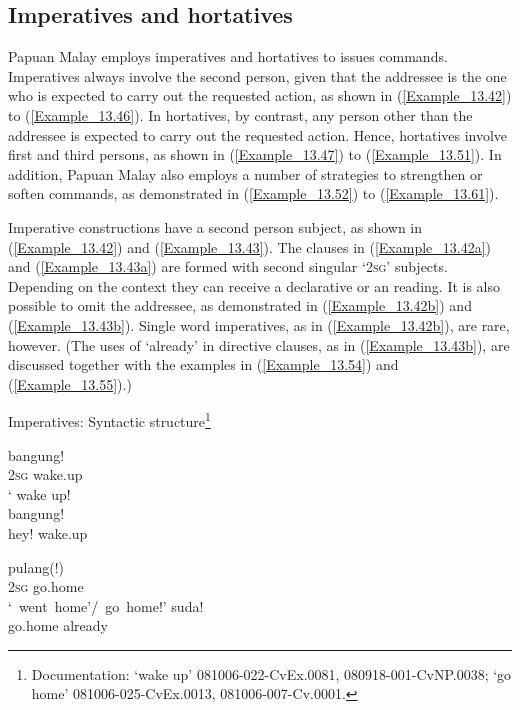 \subsection{Imperatives and hortatives}
\label{Para_13.3.1}
Papuan Malay employs imperatives and hortatives to issues commands. Imperatives always involve the second person, given that the addressee is the one who is expected to carry out the requested action, as shown in (\ref{Example_13.42}) to (\ref{Example_13.46}). In hortatives, by contrast, any person other than the addressee is expected to carry out the requested action. Hence, hortatives involve first and third persons, as shown in (\ref{Example_13.47}) to (\ref{Example_13.51}). In addition, Papuan Malay also employs a number of strategies to strengthen or soften commands, as demonstrated in (\ref{Example_13.52}) to (\ref{Example_13.61}).



Imperative constructions have a second person subject, as shown in (\ref{Example_13.42}) and (\ref{Example_13.43}). The clauses in (\ref{Example_13.42a}) and (\ref{Example_13.43a}) are formed with second singular  ‘\textsc{2sg}’ subjects. Depending on the context they can receive a declarative or an  reading. It is also possible to omit the addressee, as demonstrated in (\ref{Example_13.42b}) and (\ref{Example_13.43b}). Single word imperatives, as in (\ref{Example_13.42b}), are rare, however. (The uses of  ‘already’ in directive clauses, as in (\ref{Example_13.43b}), are discussed together with the examples in (\ref{Example_13.54}) and (\ref{Example_13.55}).)


\begin{styleExampleTitle}
Imperatives: Syntactic structure\footnote{Documentation:  ‘wake up’ 081006-022-CvEx.0081, 080918-001-CvNP.0038;  ‘go home’ 081006-025-CvEx.0013, 081006-007-Cv.0001.}
\end{styleExampleTitle}
\vspace{-13pt}
\ea
\label{Example_13.42}
\begin{multicols}{2}
\ea
\label{Example_13.42a}
 {bangung}!  \\ %
   \textsc{2sg}  wake.up \\
\glt    ‘ wake up!\\
\columnbreak
\ex
\label{Example_13.42b}
 {bangung!}\\
 hey!  wake.up\\
 \z
 \end{multicols}
 \z
\ea
\label{Example_13.43}
\begin{multicols}{2}
\setlength{\columnsep}{5pt}
\ea
\label{Example_13.43a}
 {pulang}(!)\\ %
   \textsc{2sg}  go.home\\
\glt  \mbox{‘ went home’/ go home!’}
\ex
\label{Example_13.43b}
 {suda!}\\
 go.home  already\\
\z
\end{multicols}
\z

